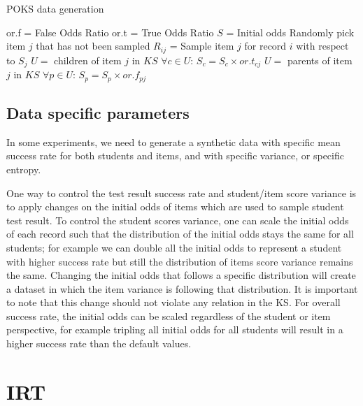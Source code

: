 \begin{algorithm}
\caption{POKS data generation}
\label{CHalgorithm}
\begin{algorithmic}[1]
\State or.f = False Odds Ratio
\State or.t = True Odds Ratio
\State  $S$ = Initial odds
\State Randomly pick item $j$ that has not been sampled
\State $R_{ij}$ =  Sample item $j$ for record $i$ with respect to $S_j$
\State $U =$ children of item $j$ in $KS$
\State  $\forall c\in U$:  $S_c = S_c\times or.t_{cj}$
\EndIf
{}
\State $U =$ parents of item $j$ in $KS$
\State  $\forall p\in U$:  $S_p = S_p\times or.f_{pj}$
\EndIf
\EndFor
\EndFor
\end{algorithmic}
\label{POKS:ALG}
\end{algorithm}



\subsection{Data specific parameters}

In some experiments, we need to generate a synthetic data with specific mean success rate for both students and items, and with specific variance, or specific entropy.

One way to control the test result success rate and student/item score variance is to apply changes on the initial odds of items which are used to sample student test result. To control the student scores variance, one can scale the initial odds of each record such that the distribution of the initial odds stays the same for all students; for example we can double all the initial odds to represent a student with higher success rate but still the distribution of items score variance remains the same. Changing the initial odds that follows a specific distribution will create a dataset in which the item variance is following that distribution. It is important to note that this change should not violate any relation in the KS. For overall success rate, the initial odds can be scaled regardless of the student or item perspective, for example tripling all initial odds for all students will result in a higher success rate than the default values. 



\section{IRT}

